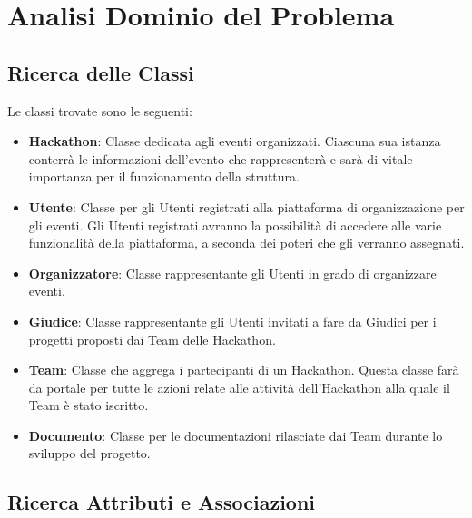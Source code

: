 \documentclass[a4paper, 15pt, oneside]{article}
\begin{document}
	\section{Analisi Dominio del Problema}
	\subsection{Ricerca delle Classi}
	Le classi trovate sono le seguenti:
	\begin{itemize}
		\item \textbf{Hackathon}: Classe dedicata agli eventi organizzati. Ciascuna sua istanza conterrà le informazioni dell'evento che rappresenterà e sarà di vitale importanza per il funzionamento della struttura.
		\item \textbf{Utente}: Classe per gli Utenti registrati alla piattaforma di organizzazione per gli eventi. Gli Utenti registrati avranno la possibilità di accedere alle varie funzionalità della piattaforma, a seconda dei poteri che gli verranno assegnati.
		\item \textbf{Organizzatore}: Classe rappresentante gli Utenti in grado di organizzare eventi.
		\item \textbf{Giudice}: Classe rappresentante gli Utenti invitati a fare da Giudici per i progetti proposti dai Team delle Hackathon.
		\item \textbf{Team}: Classe che aggrega i partecipanti di un Hackathon. Questa classe farà da portale per tutte le azioni relate alle attività dell'Hackathon alla quale il Team è stato iscritto.
		\item \textbf{Documento}:  Classe per le documentazioni rilasciate dai Team durante lo sviluppo del progetto.
	\end{itemize}
	\newpage
	\subsection{Ricerca Attributi e Associazioni}
\end{document}
